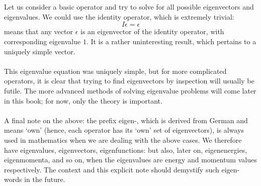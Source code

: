 \\\\
Let us consider a basic operator and try to solve for all possible eigenvectors and eigenvalues. We could use the identity operator, which is extremely trivial:
$$
I\epsilon = \epsilon
$$ means that any vector $\epsilon$ is an eigenvector of the identity operator, with corresponding eigenvalue $1$. It is a rather uninteresting result, which pertains to a uniquely simple vector. 
\\\\
This eigenvalue equation was uniquely simple, but for more complicated operators, it is clear that trying to find eigenvectors by inspection will usually be futile. The more advanced methods of solving eigenvalue problems will come later in this book; for now, only the theory is important.
\\\\
A final note on the above: the prefix eigen-, which is derived from German and means `own' (hence, each operator has its `own' set of eigenvectors), is always used in mathematics when we are dealing with the above cases. We therefore have eigenvalues, eigenvectors, eigenfunctions: but also, later on, eigenenergies, eigenmomenta, and so on, when the eigenvalues are energy and momentum values respectively. The context and this explicit note should demystify such eigen- words in the future.

